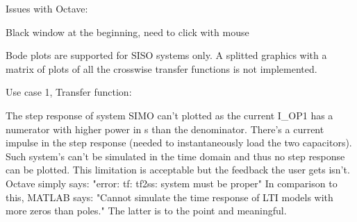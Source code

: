 Issues with Octave:

Black window at the beginning, need to click with mouse

Bode plots are supported for SISO systems only. A splitted graphics with
a matrix of plots of all the crosswise transfer functions is not
implemented.

Use case 1, Transfer function: 

The step response of system SIMO can't plotted as the current I_OP1 has a
numerator with higher power in s than the denominator. There's a current
impulse in the step response (needed to instantaneously load the two
capacitors). Such system's can't be simulated in the time domain and thus
no step response can be plotted. This limitation is acceptable but the
feedback the user gets isn't. Octave simply says: "error: tf: tf2ss:
system must be proper" In comparison to this, MATLAB says: "Cannot
simulate the time response of LTI models with more zeros than poles." The
latter is to the point and meaningful.
